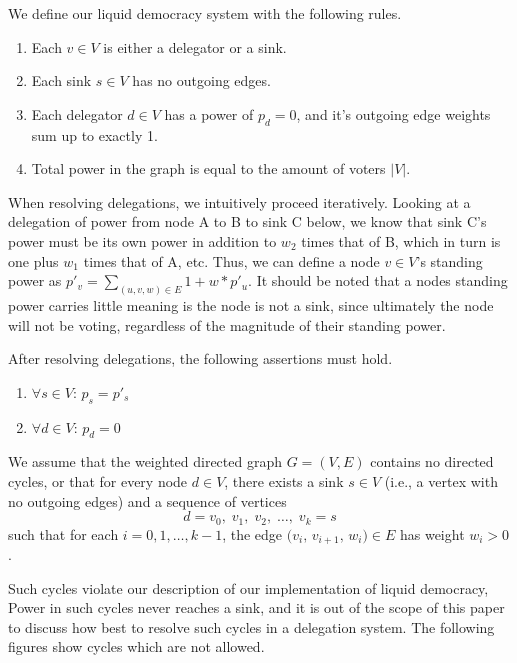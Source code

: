 We define our liquid democracy system with the following rules.

\begin{enumerate}
\item Each $v \in V$ is either a delegator or a sink. 
\item Each sink $s \in V$ has no outgoing edges.
\item Each delegator $d \in V$ has a power of $p_d = 0$, and it's outgoing edge weights sum up to exactly 1.
\item Total power in the graph is equal to the amount of voters $|V|$.
\end{enumerate}


When resolving delegations, we intuitively proceed iteratively. Looking at a delegation of power from node A to B to sink C below, we know that sink C's power must be its own power in addition to $w_2$ times that of B, which in turn is one plus $w_1$ times that of A, etc. Thus, we can define a node $v \in V$'s standing power as $p'_v = \sum_{(u, v, w) \in E} 1 + w*p'_u$. It should be noted that a nodes standing power carries little meaning is the node is not a sink, since ultimately the node will not be voting, regardless of the magnitude of their standing power.

After resolving delegations, the following assertions must hold.

\begin{enumerate}
\item $\forall s \in V$: $p_s = p'_s$
\item $\forall d \in V$: $p_d = 0$ 
\end{enumerate}

We assume that the weighted directed graph \(G=(V,E)\) contains no directed cycles, or that for every node \(d\in V\), there exists a sink \(s\in V\) (i.e., a vertex with no outgoing edges) and a sequence of vertices
\[
  d = v_{0},\; v_{1},\; v_{2},\;\dots,\; v_{k} = s
\]
such that for each \(i=0,1,\dots,k-1\), the edge \(\bigl(v_{i},\,v_{i+1},\,w_{i}\bigr)\in E\) has weight \(w_{i}>0\).

Such cycles violate our description of our implementation of liquid democracy, Power in such cycles never reaches a sink, and it is out of the scope of this paper to discuss how best to resolve such cycles in a delegation system. 
The following figures show cycles which are not allowed.

